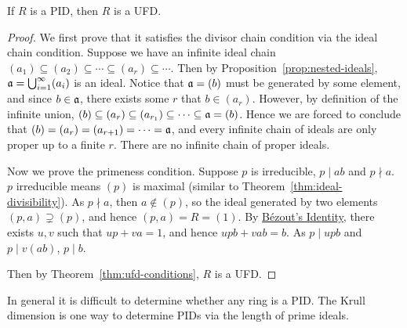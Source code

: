 \begin{theorem}\label{thm:pid-ufd}
    If \(R\) is a PID, then \(R\) is a UFD.\@
\end{theorem}
\begin{proof}
    We first prove that it satisfies the divisor chain condition
    via the ideal chain condition.
    Suppose we have an infinite ideal chain
    \((a_1) \subseteq (a_2) \subseteq \cdots \subseteq (a_r) \subseteq \cdots\).
    Then by Proposition~\ref{prop:nested-ideals},
    \(\mathfrak{a} = \bigcup_{i=1}^\infty (a_i)\) is an ideal.
    Notice that \(\mathfrak{a} = (b)\) must be generated by some element,
    and since \(b \in \mathfrak{a}\), there exists some \(r\) that \(b \in (a_r)\).
    However, by definition of the infinite union,
    \((b) \subseteq (a_r) \subseteq (a_{r_1}) \subseteq \cdots \subseteq \mathfrak{a} = (b)\).
    Hence we are forced to conclude that \((b) = (a_r) = (a_{r+1}) = \cdots = \mathfrak{a}\),
    and every infinite chain of ideals are only proper up to a finite \(r\).
    There are no infinite chain of proper ideals.

    Now we prove the primeness condition.
    Suppose \(p\) is irreducible, \(p \mid ab\) and \(p \nmid a\).
    \(p\) irreducible means \((p)\) is maximal
    (similar to Theorem~\ref{thm:ideal-divisibility}).
    As \(p \nmid a\), then \(a \notin (p)\),
    so the ideal generated by two elements \((p,a) \supsetneq (p)\),
    and hence \((p,a) = R = (1)\).
    By \hyperref[thm:bezout]{B\'{e}zout's Identity},
    there exists \(u,v\) such that \(up + va = 1\),
    and hence \(upb + vab = b\).
    As \(p \mid upb\) and \(p \mid v(ab)\), \(p \mid b\).

    Then by Theorem~\ref{thm:ufd-conditions}, \(R\) is a UFD.\@
\end{proof}
\begin{remark}
    In general it is difficult to determine whether any ring is a PID.\@
    The Krull dimension is one way to determine PIDs
    via the length of prime ideals.
\end{remark}

